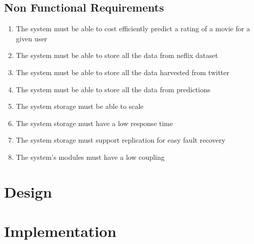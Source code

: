\section{Non Functional Requirements}
\begin{enumerate}[label=\bfseries NFR \arabic*:]
  \item The system must be able to cost efficiently predict a rating of a movie for a given user
  \item The system must be able to store all the data from neflix dataset
  \item The system must be able to store all the data harvested from twitter
  \item The system must be able to store all the data from predictions
  \item The system storage must be able to scale
  \item The system storage must have a low response time
  \item The system storage must support replication for easy fault recovery
  \item The system's modules must have a low coupling
\end{enumerate}


\chapter{Design}\label{app:design}

\chapter{Implementation}\label{app:impl}
